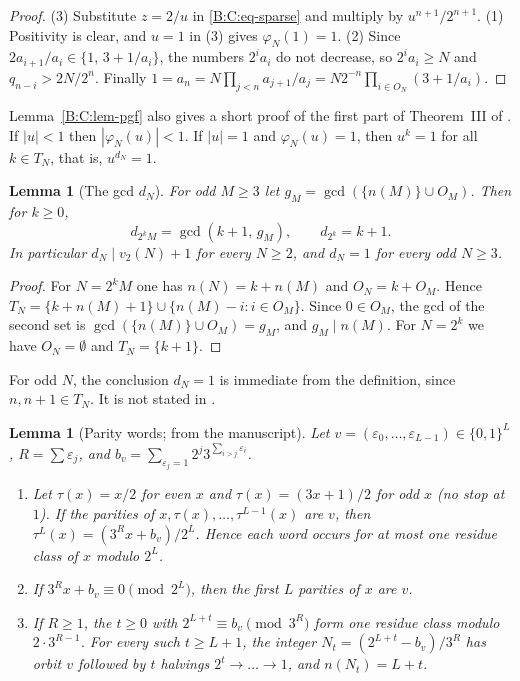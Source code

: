 \documentclass[11pt,a4paper]{article}
\newtheorem{lemma}[theorem]{Lemma}
\theoremstyle{definition}
\theoremstyle{remark}
\numberwithin{equation}{section}
\begin{document}
\begin{proof}
(3) Substitute $z=2/u$ in \eqref{B:C:eq-sparse} and multiply by $u^{n+1}/2^{n+1}$.
(1) Positivity is clear, and $u=1$ in (3) gives $\varphi_N(1)=1$.
(2) Since $2a_{i+1}/a_i\in\{1,\,3+1/a_i\}$, the numbers $2^ia_i$ do not decrease,
so $2^ia_i\ge N$ and $q_{n-i}>2N/2^n$.  Finally
$1=a_n=N\prod_{j<n}a_{j+1}/a_j=N2^{-n}\prod_{i\in O_N}(3+1/a_i)$.
\end{proof}

Lemma~\ref{B:C:lem-pgf} also gives a short proof of the first part of Theorem~III
of \cite{R005}.  If $|u|<1$ then $|\varphi_N(u)|<1$.  If $|u|=1$ and
$\varphi_N(u)=1$, then $u^k=1$ for all $k\in T_N$, that is, $u^{d_N}=1$.

\begin{lemma}[The gcd $d_N$]\label{B:C:lem-d}
For odd $M\ge3$ let $g_M=\gcd(\{n(M)\}\cup O_M)$.  Then for $k\ge0$,
\[
d_{2^kM}=\gcd(k+1,\,g_M),\qquad d_{2^k}=k+1 .
\]
In particular $d_N\mid v_2(N)+1$ for every $N\ge2$, and $d_N=1$ for every odd $N\ge3$.
\end{lemma}

\begin{proof}
For $N=2^kM$ one has $n(N)=k+n(M)$ and $O_N=k+O_M$.  Hence
$T_N=\{k+n(M)+1\}\cup\{n(M)-i:i\in O_M\}$.  Since $0\in O_M$, the gcd of the
second set is $\gcd(\{n(M)\}\cup O_M)=g_M$, and $g_M\mid n(M)$.  For $N=2^k$ we
have $O_N=\emptyset$ and $T_N=\{k+1\}$.
\end{proof}

For odd $N$, the conclusion $d_N=1$ is immediate from the definition, since
$n,n+1\in T_N$.  It is not stated in \cite{R005}.

\begin{lemma}[Parity words; from the manuscript]\label{B:C:lem-word}
Let $v=(\varepsilon_0,\dots,\varepsilon_{L-1})\in\{0,1\}^L$, $R=\sum\varepsilon_j$,
and $b_v=\sum_{\varepsilon_j=1}2^j3^{\sum_{i>j}\varepsilon_i}$.
\begin{enumerate}
\item Let $\tau(x)=x/2$ for even $x$ and $\tau(x)=(3x+1)/2$ for odd $x$ (no stop at $1$).
If the parities of $x,\tau(x),\dots,\tau^{L-1}(x)$ are $v$, then $\tau^L(x)=(3^Rx+b_v)/2^L$.  Hence each
word occurs for at most one residue class of $x$ modulo $2^L$.
\item If $3^Rx+b_v\equiv0\pmod{2^L}$, then the first $L$ parities of $x$ are $v$.
\item If $R\ge1$, the $t\ge0$ with $2^{L+t}\equiv b_v\pmod{3^R}$ form one residue
class modulo $2\cdot3^{R-1}$.  For every such $t\ge L+1$, the integer
$N_t=(2^{L+t}-b_v)/3^R$ has orbit $v$ followed by $t$ halvings
$2^t\to\dots\to1$, and $n(N_t)=L+t$.
\end{enumerate}
\end{lemma}
\end{document}
